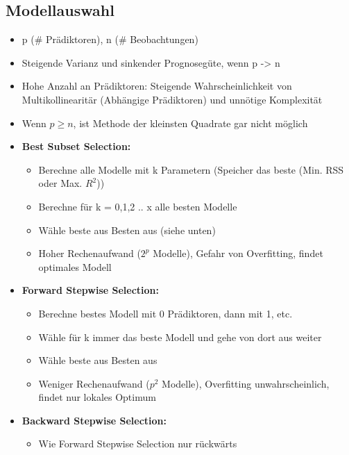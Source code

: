 \documentclass[a4paper]{article}
\begin{document}
\begin{landscape}
\begin{multicols}{3}
        \section{Modellauswahl}
        \begin{itemize}[noitemsep,nolistsep,leftmargin=*]
            \item p (\# Prädiktoren), n (\# Beobachtungen)
            \item Steigende Varianz und sinkender Prognosegüte, wenn p -> n
            \item Hohe Anzahl an Prädiktoren: Steigende Wahrscheinlichkeit von Multikollinearitär (Abhängige Prädiktoren) und unnötige Komplexität
            \item Wenn $p \geq n $, ist Methode der kleinsten Quadrate gar nicht möglich
            \item \textbf{Best Subset Selection:}
            \begin{itemize}[noitemsep,nolistsep,leftmargin=*]
                \item Berechne alle Modelle mit k Parametern (Speicher das beste (Min. RSS oder Max. $R^2$))
                \item Berechne für k = 0,1,2 .. x alle besten Modelle
                \item Wähle beste aus Besten aus (siehe unten)
                \item Hoher Rechenaufwand ($2^p$ Modelle), Gefahr von Overfitting, findet optimales Modell
            \end{itemize} 
            \item \textbf{Forward Stepwise Selection:}
            \begin{itemize}[noitemsep,nolistsep,leftmargin=*]
                \item Berechne bestes Modell mit 0 Prädiktoren, dann mit 1, etc.
                \item Wähle für k immer das beste Modell und gehe von dort aus weiter
                \item Wähle beste aus Besten aus
                \item Weniger Rechenaufwand ($p^2$ Modelle), Overfitting unwahrscheinlich, findet nur lokales Optimum
            \end{itemize}
            \item \textbf{Backward Stepwise Selection:}
            \begin{itemize}[noitemsep,nolistsep,leftmargin=*]
                \item Wie Forward Stepwise Selection nur rückwärts

\end{itemize}
\end{itemize}
\end{multicols}
\end{landscape}
\end{document}
